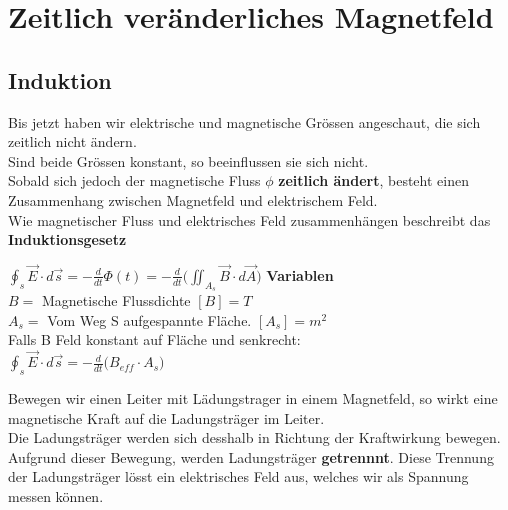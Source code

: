 




\newpage

\section{Zeitlich veränderliches Magnetfeld}

\subsection{Induktion}

Bis jetzt haben wir elektrische und magnetische Grössen angeschaut, die sich zeitlich nicht ändern. \\
Sind beide Grössen konstant, so beeinflussen sie sich nicht. \\
Sobald sich jedoch der magnetische Fluss $\phi$  \textbf{zeitlich ändert}, besteht einen Zusammenhang zwischen Magnetfeld und elektrischem Feld. \\
Wie magnetischer Fluss und elektrisches Feld zusammenhängen beschreibt das \textbf{Induktionsgesetz}


\begingl
\formulaBegin
  $\displaystyle \oint_s \vec{E}\cdot d\vec{s} = -\frac{d}{dt}\Phi(t) =  -\frac{d}{dt} \big ( \iint_{A_s} \vec{B} \cdot d\vec{A} \big )$
\formulaEnd
\textbf{Variablen} \\
$B = $ Magnetische Flussdichte $[B] = T$\\
$A_s = $ Vom Weg S aufgespannte Fläche. $[A_s] = m^2$ \\

Falls B Feld konstant auf Fläche und senkrecht: \\

\formulaBegin
  $\displaystyle  \oint_s \vec{E}\cdot d\vec{s} = -\frac{d}{dt} \big ( B_{eff} \cdot A_s \big ) $
\formulaEnd
\iend


\newpage

Bewegen wir einen Leiter mit Lädungstrager in einem Magnetfeld, so wirkt eine magnetische Kraft auf die Ladungsträger im Leiter. \\
Die Ladungsträger werden sich desshalb in Richtung der Kraftwirkung bewegen. \\
Aufgrund dieser Bewegung, werden Ladungsträger \textbf{getrennnt}. Diese Trennung der Ladungsträger lösst ein elektrisches Feld aus, welches wir als Spannung messen können.


